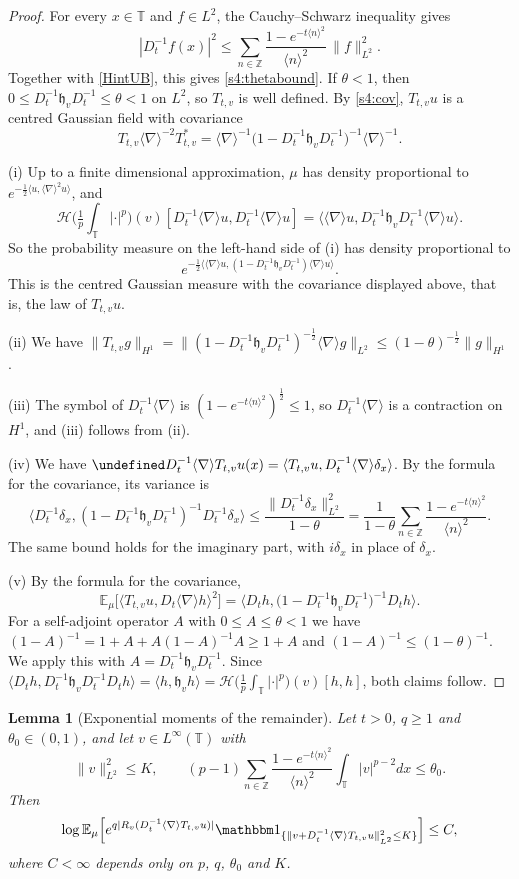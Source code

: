 \documentclass[letterpaper, 11pt,  reqno]{amsart}
\newtheorem{lemma}[theorem]{Lemma}
\theoremstyle{definition}
\newcommand{\1}{\mathbbm 1}
\newcommand{\Z}{\mathbb{Z}}
\newcommand{\T}{\mathbb{T}}
\newcommand{\0}{\mathbf 0}
\newcommand{\E}{\mathbb{E}}
\newcommand{\dl}{\delta}
\newcommand{\nb}{\nabla}
\newcommand{\jb}[1]
{\langle #1 \rangle}
\newcommand{\ind}{\mathbbm 1}
\numberwithin{equation}{section}
\numberwithin{theorem}{section}
\let\Re=\undefined\DeclareMathOperator*{\Re}{Re}
\newcommand{\HF}[2]{\mathcal H\big(\tfrac1p{\textstyle\int_\T}|\cdot|^p\big)(#1)[#2]}
\begin{document}
\begin{proof}
For every $x\in\T$ and $f\in L^2$, the Cauchy--Schwarz inequality gives
\[
|D_t^{-1}f(x)|^2\le\sum_{n\in\Z}\frac{1-e^{-t\jb n^2}}{\jb n^2}\,\|f\|_{L^2}^2 .
\]
Together with \eqref{HintUB}, this gives \eqref{s4:thetabound}. If
$\theta<1$, then $0\le D_t^{-1}\mathfrak h_vD_t^{-1}\le\theta<1$ on $L^2$, so $T_{t,v}$ is well
defined. By \eqref{s4:cov}, $T_{t,v}u$ is a centred Gaussian field with covariance
\[
T_{t,v}\jb\nb^{-2}T_{t,v}^*=\jb\nb^{-1}\big(1-D_t^{-1}\mathfrak h_vD_t^{-1}\big)^{-1}\jb\nb^{-1}.
\]
 
(i) Up to a finite dimensional approximation, $\mu$ has density proportional to
$e^{-\frac12\jb{u,\jb\nb^2u}}$, and
\[
\HF{v}{D_t^{-1}\jb\nb u,D_t^{-1}\jb\nb u}=\jb{\jb\nb u,D_t^{-1}\mathfrak h_vD_t^{-1}\jb\nb u}.
\]
So the probability measure on the left-hand side of (i) has density proportional to
\[
e^{-\frac12\jb{\jb\nb u,(1-D_t^{-1}\mathfrak h_vD_t^{-1})\jb\nb u}}.
\]
This is the centred Gaussian measure with the covariance displayed above, that is,
the law of $T_{t,v}u$.
 
(ii) We have $\|T_{t,v}g\|_{H^1}=\|(1-D_t^{-1}\mathfrak h_vD_t^{-1})^{-\frac12}\jb\nb g\|_{L^2}\le(1-\theta)^{-\frac12}\|g\|_{H^1}$.
 
(iii) The symbol of $D_t^{-1}\jb\nb$ is $(1-e^{-t\jb n^2})^{\frac12}\le1$, so $D_t^{-1}\jb\nb$ is a
contraction on $H^1$, and (iii) follows from (ii).

(iv) We have $\Re D_t^{-1}\jb\nb T_{t,v}u(x)=\jb{T_{t,v}u,D_t^{-1}\jb\nb\dl_x}$. By the formula for
the covariance, its variance is
\[
\jb{D_t^{-1}\dl_x,(1-D_t^{-1}\mathfrak h_vD_t^{-1})^{-1}D_t^{-1}\dl_x}\le\frac{\|D_t^{-1}\dl_x\|_{L^2}^2}{1-\theta}=\frac1{1-\theta}\sum_{n\in\Z}\frac{1-e^{-t\jb n^2}}{\jb n^2}.
\]
The same bound holds for the imaginary part, with $i\dl_x$ in place of $\dl_x$.
 
(v) By the formula for the covariance,
\[
\E_\mu\big[\jb{T_{t,v}u,D_t\jb\nb h}^2\big]=\big\langle D_th,\big(1-D_t^{-1}\mathfrak h_vD_t^{-1}\big)^{-1}D_th\big\rangle .
\]
For a self-adjoint operator $A$ with $0\le A\le\theta<1$ we have
$(1-A)^{-1}=1+A+A(1-A)^{-1}A\ge1+A$ and $(1-A)^{-1}\le(1-\theta)^{-1}$. We apply this
with $A=D_t^{-1}\mathfrak h_vD_t^{-1}$. Since
$\jb{D_th,D_t^{-1}\mathfrak h_vD_t^{-1}D_th}=\jb{h,\mathfrak h_vh}=\HF{v}{h,h}$, both claims follow.
\end{proof}
 
\begin{lemma}[Exponential moments of the remainder]\label{s4:LEM:BD}
Let $t>0$, $q\ge1$ and $\theta_0\in(0,1)$, and let $v\in L^\infty(\T)$ with
\[
\|v\|_{L^2}^2\le K,\qquad (p-1)\sum_{n\in\Z}\frac{1-e^{-t\jb n^2}}{\jb n^2}\int_\T|v|^{p-2}dx\le\theta_0 .
\]
Then
\[
\log\E_\mu\Big[e^{q|R_v(D_t^{-1}\jb\nb T_{t,v}u)|}\ind_{\{\|v+D_t^{-1}\jb\nb T_{t,v}u\|_{L^2}^2\le K\}}\Big]\le C,
\]
where $C<\infty$ depends only on $p$, $q$, $\theta_0$ and $K$.
\end{lemma}
\end{document}
